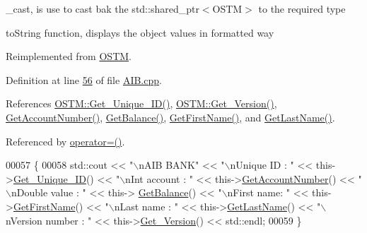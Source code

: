\+\_\+cast, is use to cast bak the std\+::shared\+\_\+ptr$<$\+O\+S\+T\+M$>$ to the required type 

to\+String function, displays the object values in formatted way 

Reimplemented from \hyperlink{class_o_s_t_m_a513396a115f2987fd07c203309ae8a59_a513396a115f2987fd07c203309ae8a59}{O\+S\+TM}.



Definition at line \hyperlink{_a_i_b_8cpp_source_l00056}{56} of file \hyperlink{_a_i_b_8cpp_source}{A\+I\+B.\+cpp}.



References \hyperlink{_o_s_t_m_8cpp_source_l00073}{O\+S\+T\+M\+::\+Get\+\_\+\+Unique\+\_\+\+I\+D()}, \hyperlink{_o_s_t_m_8cpp_source_l00089}{O\+S\+T\+M\+::\+Get\+\_\+\+Version()}, \hyperlink{_a_i_b_8cpp_source_l00081}{Get\+Account\+Number()}, \hyperlink{_a_i_b_8cpp_source_l00073}{Get\+Balance()}, \hyperlink{_a_i_b_8cpp_source_l00097}{Get\+First\+Name()}, and \hyperlink{_a_i_b_8cpp_source_l00089}{Get\+Last\+Name()}.



Referenced by \hyperlink{_a_i_b_8h_source_l00066}{operator=()}.


\begin{DoxyCode}
00057 \{
00058     std::cout << \textcolor{stringliteral}{"\(\backslash\)nAIB BANK"} << \textcolor{stringliteral}{"\(\backslash\)nUnique ID : "} << this->\hyperlink{class_o_s_t_m_a5a01a8b98d16b1d1904ecf9356e7b71d_a5a01a8b98d16b1d1904ecf9356e7b71d}{Get\_Unique\_ID}() << \textcolor{stringliteral}{"\(\backslash\)nInt account :
       "} << this->\hyperlink{class_a_i_b_aef34bfbf20d767114e05b8b532cab777_aef34bfbf20d767114e05b8b532cab777}{GetAccountNumber}() << \textcolor{stringliteral}{"\(\backslash\)nDouble value : "} << this->
      \hyperlink{class_a_i_b_ac75087ae73c308bd946e47a71dc85b86_ac75087ae73c308bd946e47a71dc85b86}{GetBalance}() << \textcolor{stringliteral}{"\(\backslash\)nFirst name: "} << this->\hyperlink{class_a_i_b_aa0833919c1c211481560cd88cb5b381b_aa0833919c1c211481560cd88cb5b381b}{GetFirstName}() << \textcolor{stringliteral}{"\(\backslash\)nLast name : "} << 
      this->\hyperlink{class_a_i_b_a1b09db7268734beeaf6a9e7e9d8feb02_a1b09db7268734beeaf6a9e7e9d8feb02}{GetLastName}()  << \textcolor{stringliteral}{"\(\backslash\)nVersion number : "} << this->\hyperlink{class_o_s_t_m_a1f1db9d482f22c8e7caa17dfb340626b_a1f1db9d482f22c8e7caa17dfb340626b}{Get\_Version}() << std::endl;
00059 \}
\end{DoxyCode}


